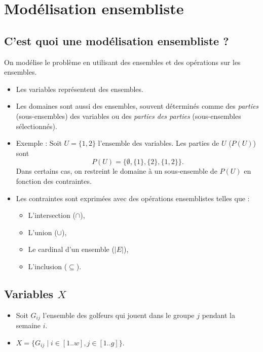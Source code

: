 \documentclass{article}
\begin{document}
\section*{Mod\'elisation ensembliste}

\subsection*{C'est quoi une mod\'elisation ensembliste ?}

On mod\'elise le probl\`eme en utilisant des ensembles et des op\'erations sur les ensembles.

\begin{itemize}[label=\textbullet]
    \item Les variables repr\'esentent des ensembles.
    \item Les domaines sont aussi des ensembles, souvent d\'etermin\'es comme des \emph{parties} (sous-ensembles) des variables ou des \emph{parties des parties} (sous-ensembles s\'electionn\'es).
    \item Exemple : Soit $U = \{1, 2\}$ l'ensemble des variables. Les parties de $U$ ($P(U)$) sont \[ P(U) = \{ \emptyset, \{1\}, \{2\}, \{1, 2\}\}. \] Dans certains cas, on restreint le domaine \`a un sous-ensemble de $P(U)$ en fonction des contraintes.
    \item Les contraintes sont exprim\'ees avec des op\'erations ensemblistes telles que :
    \begin{itemize}[label=\textendash]
        \item L'intersection ($\cap$),
        \item L'union ($\cup$),
        \item Le cardinal d'un ensemble ($|E|$),
        \item L'inclusion ($\subseteq$).
    \end{itemize}
\end{itemize}

\subsection*{Variables $X$}

\begin{itemize}[label=\textbullet]
    \item Soit $G_{ij}$ l'ensemble des golfeurs qui jouent dans le groupe $j$ pendant la semaine $i$.
    \item $X = \{G_{ij} \mid i \in [1..w], j \in [1..g]\}$.
\end{itemize}
\end{document}
